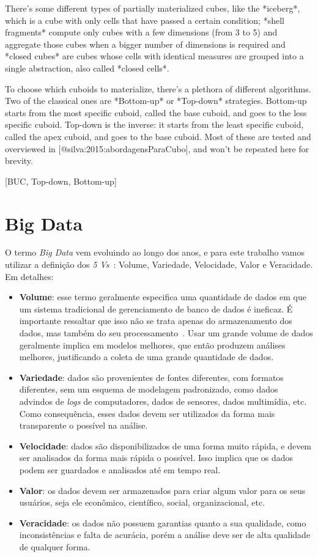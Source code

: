 There's some different types of partially materialized cubes, like the *iceberg*, which is a cube with only cells that have passed a certain condition; *shell fragments* compute only cubes with a few dimensions (from 3 to 5) and aggregate those cubes when a bigger number of dimensions is required and *closed cubes* are cubes whose cells with identical measures are grouped into a single abstraction, also called *closed cells*.

To choose which cuboids to materialize, there's a plethora of different algorithms.
Two of the classical ones are *Bottom-up* or *Top-down* strategies.
Bottom-up starts from the most specific cuboid, called the base cuboid, and goes to the less specific cuboid.
Top-down is the inverse: it starts from the least specific cuboid, called the apex cuboid, and goes to the base cuboid.
Most of these are tested and overviewed in [@silva:2015:abordagensParaCubo], and won't be repeated here for brevity.

[BUC, Top-down, Bottom-up]

\section{Big Data}
\label{ch:fun:bigdata}

O termo \textit{Big Data} vem evoluindo ao longo dos anos, e para este trabalho vamos utilizar a definição dos \textit{5 Vs}~\cite{bimonteOpenIssuesBig2016}: Volume, Variedade, Velocidade, Valor e Veracidade. Em detalhes:

\begin{itemize}
	\item \textbf{Volume}: esse termo geralmente especifica uma quantidade de dados em que um sistema tradicional de gerenciamento de banco de dados é ineficaz.
É importante ressaltar que isso não se trata apenas do armazenamento dos dados, mas também do seu processamento~\cite{boussoufBigDataBased2018}.
Usar um grande volume de dados geralmente implica em modelos melhores, que então produzem análises melhores, justificando a coleta de uma grande quantidade de dados.
	\item \textbf{Variedade}: dados são provenientes de fontes diferentes, com formatos diferentes, sem um esquema de modelagem padronizado, como dados advindos de \textit{logs} de computadores, dados de sensores, dados multimídia, etc.
Como consequência, esses dados devem ser utilizados da forma mais transparente o possível na análise.
	\item \textbf{Velocidade}: dados são disponibilizados de uma forma muito rápida, e devem ser analisados da forma mais rápida o possível.
Isso implica que os dados podem ser guardados e analisados até em tempo real.
	\item \textbf{Valor}: os dados devem ser armazenados para criar algum valor para os seus usuários, seja ele econômico, científico, social, organizacional, etc.
	\item \textbf{Veracidade}: os dados não possuem garantias quanto a sua qualidade, como inconsistências e falta de acurácia, porém a análise deve ser de alta qualidade de qualquer forma.
\end{itemize}

